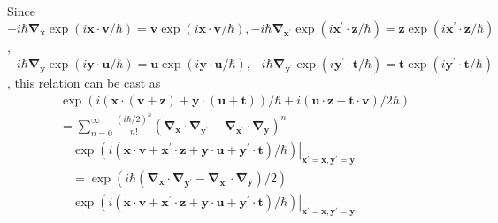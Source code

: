 \documentclass{article}
\begin{document}
Since $-i \hbar \boldsymbol{\nabla}_{\boldsymbol{x}} \exp (i \boldsymbol{x} \cdot \boldsymbol{v} / \hbar)=\boldsymbol{v} \exp (i \boldsymbol{x} \cdot \boldsymbol{v} / \hbar),-i \hbar \boldsymbol{\nabla}_{\boldsymbol{x}^{\prime}} \exp \left(i \boldsymbol{x}^{\prime} \cdot \boldsymbol{z} / \hbar\right)=\boldsymbol{z} \exp \left(i \boldsymbol{x}^{\prime} \cdot \boldsymbol{z} / \hbar\right)$, $-i \hbar \boldsymbol{\nabla}_{\boldsymbol{y}} \exp (i \boldsymbol{y} \cdot \boldsymbol{u} / \hbar)=\boldsymbol{u} \exp (i \boldsymbol{y} \cdot \boldsymbol{u} / \hbar),-i \hbar \boldsymbol{\nabla}_{\boldsymbol{y}^{\prime}} \exp \left(i \boldsymbol{y}^{\prime} \cdot \boldsymbol{t} / \hbar\right)=\boldsymbol{t} \exp \left(i \boldsymbol{y}^{\prime} \cdot \boldsymbol{t} / \hbar\right)$, this relation can be cast as
$$
\begin{align*}
& \exp (i(\boldsymbol{x} \cdot(\boldsymbol{v}+\boldsymbol{z})+\boldsymbol{y} \cdot(\boldsymbol{u}+\boldsymbol{t})) / \hbar+i(\boldsymbol{u} \cdot \boldsymbol{z}-\boldsymbol{t} \cdot \boldsymbol{v}) / 2 \hbar)  \tag{3.7.42}\\
& =\sum_{n=0}^{\infty} \frac{(i \hbar / 2)^{n}}{n!}\left(\boldsymbol{\nabla}_{\boldsymbol{x}} \cdot \boldsymbol{\nabla}_{\boldsymbol{y}^{\prime}}-\boldsymbol{\nabla}_{\boldsymbol{x}^{\prime}} \cdot \boldsymbol{\nabla}_{\boldsymbol{y}}\right)^{n} \\
& \left.\quad \exp \left(i\left(\boldsymbol{x} \cdot \boldsymbol{v}+\boldsymbol{x}^{\prime} \cdot \boldsymbol{z}+\boldsymbol{y} \cdot \boldsymbol{u}+\boldsymbol{y}^{\prime} \cdot \boldsymbol{t}\right) / \hbar\right)\right|_{\boldsymbol{x}^{\prime}=\boldsymbol{x}, \boldsymbol{y}^{\prime}=\boldsymbol{y}} \\
& \quad=\exp \left(i \hbar\left(\boldsymbol{\nabla}_{\boldsymbol{x}} \cdot \boldsymbol{\nabla}_{\boldsymbol{y}^{\prime}}-\boldsymbol{\nabla}_{\boldsymbol{x}^{\prime}} \cdot \boldsymbol{\nabla}_{\boldsymbol{y}}\right) / 2\right) \\
& \left.\quad \exp \left(i\left(\boldsymbol{x} \cdot \boldsymbol{v}+\boldsymbol{x}^{\prime} \cdot \boldsymbol{z}+\boldsymbol{y} \cdot \boldsymbol{u}+\boldsymbol{y}^{\prime} \cdot \boldsymbol{t}\right) / \hbar\right)\right|_{\boldsymbol{x}^{\prime}=\boldsymbol{x}, \boldsymbol{y}^{\prime}=\boldsymbol{y}}
\end{align*}
$$
\end{document}
